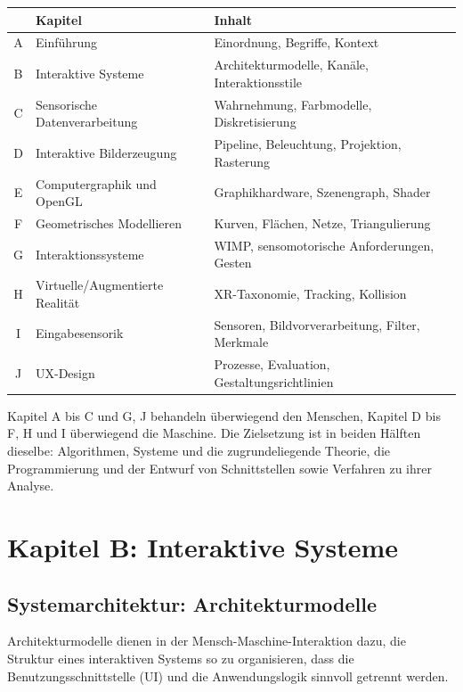 \documentclass[12pt, a4paper]{article}
\begin{document}
\begin{center}
\begin{tabular}{@{}clp{7.2cm}@{}}
\toprule
& \textbf{Kapitel} & \textbf{Inhalt} \\
\midrule
A & Einführung & Einordnung, Begriffe, Kontext \\
B & Interaktive Systeme & Architekturmodelle, Kanäle, Interaktionsstile \\
C & Sensorische Datenverarbeitung & Wahrnehmung, Farbmodelle, Diskretisierung \\
D & Interaktive Bilderzeugung & Pipeline, Beleuchtung, Projektion, Rasterung \\
E & Computergraphik und OpenGL & Graphikhardware, Szenengraph, Shader \\
F & Geometrisches Modellieren & Kurven, Flächen, Netze, Triangulierung \\
G & Interaktionssysteme & WIMP, sensomotorische Anforderungen, Gesten \\
H & Virtuelle/Augmentierte Realität & XR-Taxonomie, Tracking, Kollision \\
I & Eingabesensorik & Sensoren, Bildvorverarbeitung, Filter, Merkmale \\
J & UX-Design & Prozesse, Evaluation, Gestaltungsrichtlinien \\
\bottomrule
\end{tabular}
\end{center}

Kapitel A bis C und G, J behandeln überwiegend den Menschen, Kapitel D bis F, H und I
überwiegend die Maschine. Die Zielsetzung ist in beiden Hälften dieselbe: Algorithmen,
Systeme und die zugrundeliegende Theorie, die Programmierung und der Entwurf von
Schnittstellen sowie Verfahren zu ihrer Analyse.

\section{Kapitel B: Interaktive Systeme}

\subsection{Systemarchitektur: Architekturmodelle}

Architekturmodelle dienen in der Mensch-Maschine-Interaktion dazu, die Struktur eines
interaktiven Systems so zu organisieren, dass die Benutzungsschnittstelle (UI) und die
Anwendungslogik sinnvoll getrennt werden.
\end{document}
